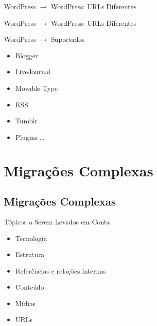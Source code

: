 \documentclass[handout]{beamer}
\begin{document}
\begin{frame}[fragile]{WordPress $\rightarrow$ WordPress: URLs Diferentes}
  
  \pause
  
\end{frame}

\begin{frame}[fragile]{WordPress $\rightarrow$ WordPress: URLs Diferentes}
  
\end{frame}

\begin{frame}{WordPress $\rightarrow$ Suportados}
\begin{itemize}
  \pause
  \item Blogger
  \item LiveJournal
  \item Movable Type
  \item RSS
  \item Tumblr
  \item Plugins \ldots
\end{itemize}
\end{frame}

\section{Migrações Complexas}
\subsection{Migrações Complexas}

\begin{frame}{Tópicos a Serem Levados em Conta}
  \begin{itemize}
    \pause \item Tecnologia
    \pause \item Estrutura
    \pause \item Referências e relações internas
    \pause \item Conteúdo
    \pause \item Mídias
    \pause \item URLs
  \end{itemize}
\end{frame}
\end{document}
